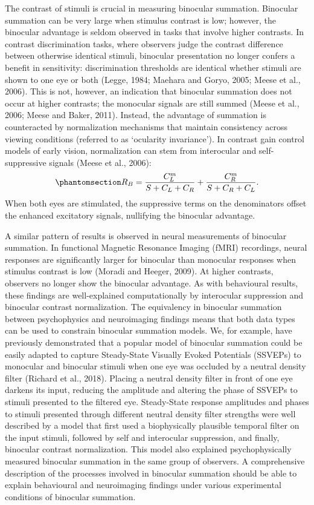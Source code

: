 \documentclass[
  12pt,
]{article}
\begin{document}
The contrast of stimuli is crucial in measuring binocular summation.
Binocular summation can be very large when stimulus contrast is low;
however, the binocular advantage is seldom observed in tasks that
involve higher contrasts. In contrast discrimination tasks, where
observers judge the contrast difference between otherwise identical
stimuli, binocular presentation no longer confers a benefit in
sensitivity: discrimination thresholds are identical whether stimuli are
shown to one eye or both (Legge, 1984; Maehara and Goryo, 2005; Meese et
al., 2006). This is not, however, an indication that binocular summation
does not occur at higher contrasts; the monocular signals are still
summed (Meese et al., 2006; Meese and Baker, 2011). Instead, the
advantage of summation is counteracted by normalization mechanisms that
maintain consistency across viewing conditions (referred to as
`ocularity invariance'). In contrast gain control models of early
vision, normalization can stem from interocular and self-suppressive
signals (Meese et al., 2006):
\begin{equation}\phantomsection\label{eq-intoMath2}{
R_B = \frac{C_L^m}{S+C_L+C_R} + \frac{C_R^m}{S+C_R+C_L}.
}\end{equation} When both eyes are stimulated, the suppressive terms on
the denominators offset the enhanced excitatory signals, nullifying the
binocular advantage.

A similar pattern of results is observed in neural measurements of
binocular summation. In functional Magnetic Resonance Imaging (fMRI)
recordings, neural responses are significantly larger for binocular than
monocular responses when stimulus contrast is low (Moradi and Heeger,
2009). At higher contrasts, observers no longer show the binocular
advantage. As with behavioural results, these findings are
well-explained computationally by interocular suppression and binocular
contrast normalization. The equivalency in binocular summation between
psychophysics and neuroimaging findings means that both data types can
be used to constrain binocular summation models. We, for example, have
previously demonstrated that a popular model of binocular summation
could be easily adapted to capture Steady-State Visually Evoked
Potentials (SSVEPs) to monocular and binocular stimuli when one eye was
occluded by a neutral density filter (Richard et al., 2018). Placing a
neutral density filter in front of one eye darkens its input, reducing
the amplitude and altering the phase of SSVEPs to stimuli presented to
the filtered eye. Steady-State response amplitudes and phases to stimuli
presented through different neutral density filter strengths were well
described by a model that first used a biophysically plausible temporal
filter on the input stimuli, followed by self and interocular
suppression, and finally, binocular contrast normalization. This model
also explained psychophysically measured binocular summation in the same
group of observers. A comprehensive description of the processes
involved in binocular summation should be able to explain behavioural
and neuroimaging findings under various experimental conditions of
binocular summation.
\end{document}
